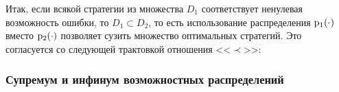 Итак, если всякой стратегии из множества $D_1$ соответствует ненулевая возможность ошибки, то $D_1\subset D_2$, то есть использование распределения ${\mathrm{p}}_1(\cdot)$ вместо ${\mathrm{p}}_2(\cdot)$ позволяет сузить множество оптимальных стратегий. 
Это согласуется со следующей трактовкой отношения <<$\prec$>>: 
\begin{center}  \end{center}



	
\subsubsection{Супремум и инфинум возможностных распределений}
\label{inf_sup_poss}

